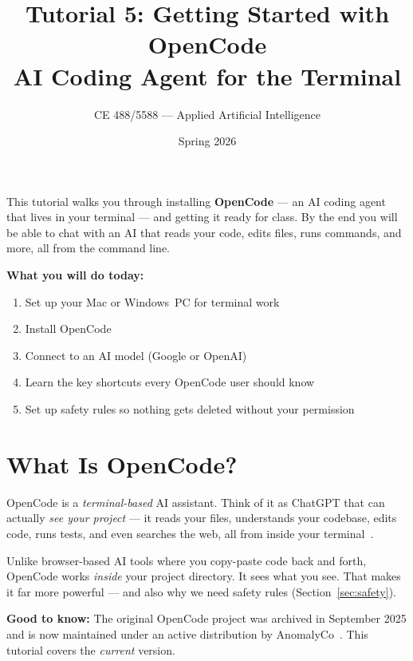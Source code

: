 \documentclass[12pt]{article}
\title{\textbf{Tutorial 5: Getting Started with OpenCode}\\[4pt]
       {\large AI Coding Agent for the Terminal}}
\author{CE 488/5588 --- Applied Artificial Intelligence}
\date{Spring 2026}
\begin{document}
\maketitle

\begin{ch-box}
This tutorial walks you through installing \textbf{OpenCode} --- an AI coding agent that lives in your terminal --- and getting it ready for class.  By the end you will be able to chat with an AI that reads your code, edits files, runs commands, and more, all from the command line.

\medskip\noindent\textbf{What you will do today:}
\begin{enumerate}[nosep]
  \item Set up your Mac or Windows~PC for terminal work
  \item Install OpenCode
  \item Connect to an AI model (Google or OpenAI)
  \item Learn the key shortcuts every OpenCode user should know
  \item Set up safety rules so nothing gets deleted without your permission
\end{enumerate}
\end{ch-box}

\section{What Is OpenCode?}

OpenCode is a \emph{terminal-based} AI assistant.  Think of it as ChatGPT that can actually \emph{see your project} --- it reads your files, understands your codebase, edits code, runs tests, and even searches the web, all from inside your terminal~\cite{opencode2025,opencode_readme2025}.

\begin{def-box}
Unlike browser-based AI tools where you copy-paste code back and forth, OpenCode works \emph{inside} your project directory.  It sees what you see.  That makes it far more powerful --- and also why we need safety rules (Section~\ref{sec:safety}).
\end{def-box}

\begin{alert-box}
\textbf{Good to know:} The original OpenCode project was archived in September 2025 and is now maintained under an active distribution by AnomalyCo~\cite{anomalyco_opencode2026,opencode_install2026}.  This tutorial covers the \emph{current} version.
\end{alert-box}
\end{document}
